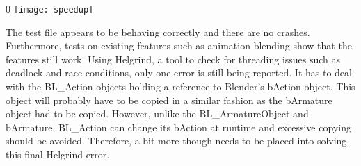 \documentclass[10pt]{article}
\begin{document}
\medskip
\begin{center}0
\texttt{[image: speedup]}
\end{center}

The test file appears to be behaving correctly and there are no crashes. Furthermore, tests on existing features such as animation blending show that the features still work. Using Helgrind, a tool to check for threading issues such as deadlock and race conditions, only one error is still being reported. It has to deal with the BL\_Action objects holding a reference to Blender's bAction object. This object will probably have to be copied in a similar fashion as the bArmature object had to be copied. However, unlike the BL\_ArmatureObject and bArmature, BL\_Action can change its bAction at runtime and excessive copying should be avoided. Therefore, a bit more though needs to be placed into solving this final Helgrind error.



\end{document}
